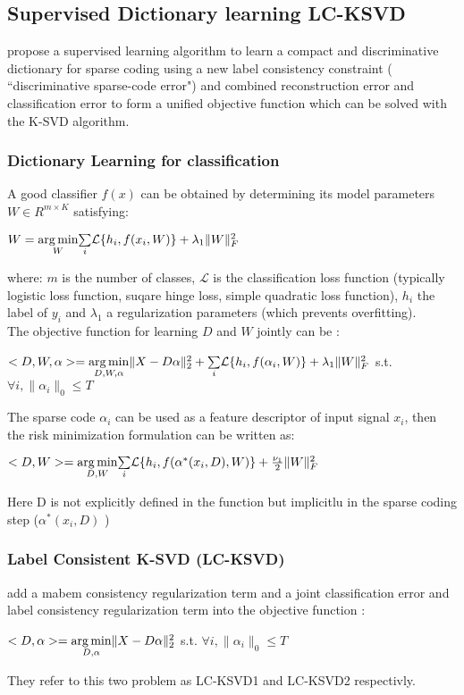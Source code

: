 \subsection{Supervised Dictionary learning LC-KSVD}
\cite{6516503} propose a supervised learning algorithm to learn a compact and discriminative dictionary for sparse coding using a new label consistency constraint ( ``discriminative sparse-code error") and combined reconstruction error and classification error to form a unified objective function which can be solved with the K-SVD algorithm.
\subsubsection{Dictionary Learning for classification}
A good classifier $f(x)$ can be obtained by determining its model parameters $W \in R^{m \times K} $ satisfying:
\begin{center}
 $W = \underset{W}{\operatorname*{arg\,min}} \underset{i}{\sum}\mathcal{L}\{h_i,f(x_i,W)\} + \lambda_1 \|W\|^2_F$
\end{center}
where: $m$ is the number of classes, $\mathcal{L}$ is the classification loss function (typically logistic loss function, suqare hinge loss, simple quadratic loss function), $h_i$ the label of $y_i$ and $\lambda_1$ a regularization parameters (which prevents overfitting).\\
The objective function for learning $D$ and $W$ jointly can be :
\begin{center}
 $<D,W,\alpha> = \underset{D,W,\alpha}{\operatorname*{arg\,min}} \|X -D\alpha\|^2_2 + \underset{i}{\sum}\mathcal{L}\{h_i,f(\alpha_i,W)\} + \lambda_1 \|W\|^2_F$  s.t.  $\forall i, \|\alpha_i\|_0 \leq T$ 
\end{center}

The sparse code $\alpha_i$ can be used as a feature descriptor of input signal $x_i$, then the risk minimization formulation can be written as:
\begin{center}
 $<D,W> = \underset{D,W}{\operatorname*{arg\,min}}\underset{i}{\sum}\mathcal{L}\{h_i,f(\alpha^*(x_i,D),W)\} + \frac{\nu_1}{2}\|W\|^2_F$
\end{center}
Here D is not explicitly defined in the function but implicitlu in the sparse coding step ($\alpha^*(x_i,D)$ )

\subsubsection{Label Consistent K-SVD (LC-KSVD)}
\cite{6516503} add a mabem consistency regularization term and a joint classification error and label consistency regularization term into the objective function :
\begin{center}
 $<D,\alpha> = \underset{D,\alpha}{\operatorname*{arg\,min}} \|X - D\alpha\|^2_2$ s.t. $ \forall i, \|\alpha_i\|_0 \leq T$
\end{center}
They refer to this two problem as LC-KSVD1 and LC-KSVD2 respectivly.

